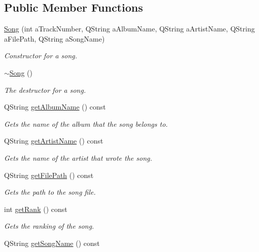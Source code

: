 \subsection*{Public Member Functions}
\begin{DoxyCompactItemize}
\item 
\mbox{\hyperlink{class_song_a996efbf0aa4da8315e0082107e6c6854}{Song}} (int a\+Track\+Number, Q\+String a\+Album\+Name, Q\+String a\+Artist\+Name, Q\+String a\+File\+Path, Q\+String a\+Song\+Name)
\begin{DoxyCompactList}\small\item\em Constructor for a song. \end{DoxyCompactList}\item 
\mbox{\hyperlink{class_song_a0749c3367e8de89e27458c248377027b}{$\sim$\+Song}} ()
\begin{DoxyCompactList}\small\item\em The destructor for a song. \end{DoxyCompactList}\item 
Q\+String \mbox{\hyperlink{class_song_a34913925a88e1ca698aa33af96378d2f}{get\+Album\+Name}} () const
\begin{DoxyCompactList}\small\item\em Gets the name of the album that the song belongs to. \end{DoxyCompactList}\item 
Q\+String \mbox{\hyperlink{class_song_a90ab22ea210ca1552d08f50da4c51ff5}{get\+Artist\+Name}} () const
\begin{DoxyCompactList}\small\item\em Gets the name of the artist that wrote the song. \end{DoxyCompactList}\item 
Q\+String \mbox{\hyperlink{class_song_a2c71fd5ffa7343e7688554b2f9a10120}{get\+File\+Path}} () const
\begin{DoxyCompactList}\small\item\em Gets the path to the song file. \end{DoxyCompactList}\item 
int \mbox{\hyperlink{class_song_ab80f9bd4c1b971be3daa0df1aaa2bc89}{get\+Rank}} () const
\begin{DoxyCompactList}\small\item\em Gets the ranking of the song. \end{DoxyCompactList}\item 
Q\+String \mbox{\hyperlink{class_song_a9507aeaa55d6c31f829e42432f6b5de3}{get\+Song\+Name}} () const

\end{DoxyCompactItemize}
